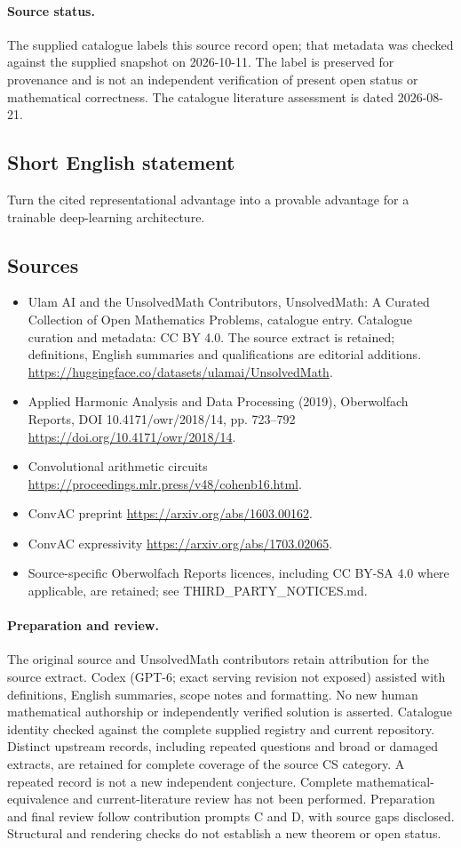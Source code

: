 \documentclass[11pt]{article}
\begin{document}
\paragraph{Source status.}
The supplied catalogue labels this source record open; that metadata was checked against the supplied snapshot on 2026-10-11. The label is preserved for provenance and is not an independent verification of present open status or mathematical correctness. The catalogue literature assessment is dated 2026-08-21.
\subsection{Short English statement}
Turn the cited representational advantage into a provable advantage for a trainable deep-learning architecture.
\subsection{Sources}
\begin{itemize}
\item[S1] Ulam AI and the UnsolvedMath Contributors, UnsolvedMath: A Curated Collection of Open Mathematics Problems, catalogue entry. Catalogue curation and metadata: CC BY 4.0. The source extract is retained; definitions, English summaries and qualifications are editorial additions.
\url{https://huggingface.co/datasets/ulamai/UnsolvedMath}.
\item[S2] Applied Harmonic Analysis and Data Processing (2019), Oberwolfach Reports, DOI 10.4171/owr/2018/14, pp. 723--792
\url{https://doi.org/10.4171/owr/2018/14}.
\item[S3] Convolutional arithmetic circuits
\url{https://proceedings.mlr.press/v48/cohenb16.html}.
\item[S4] ConvAC preprint
\url{https://arxiv.org/abs/1603.00162}.
\item[S5] ConvAC expressivity
\url{https://arxiv.org/abs/1703.02065}.
\item Source-specific Oberwolfach Reports licences, including CC BY-SA 4.0 where applicable, are retained; see THIRD\_PARTY\_NOTICES.md.
\end{itemize}
\paragraph{Preparation and review.}
The original source and UnsolvedMath contributors retain attribution for the source extract. Codex (GPT-6; exact serving revision not exposed) assisted with definitions, English summaries, scope notes and formatting. No new human mathematical authorship or independently verified solution is asserted. Catalogue identity checked against the complete supplied registry and current repository. Distinct upstream records, including repeated questions and broad or damaged extracts, are retained for complete coverage of the source CS category. A repeated record is not a new independent conjecture. Complete mathematical-equivalence and current-literature review has not been performed. Preparation and final review follow contribution prompts C and D, with source gaps disclosed. Structural and rendering checks do not establish a new theorem or open status.
\label{end:statement}
\end{document}
